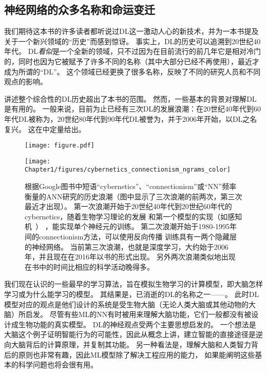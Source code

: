 \subsection{神经网络的众多名称和命运变迁}
\label{sec:the_many_names_and_changing_fortunes_of_neural_networks}

我们期待这本书的许多读者都听说过\gls{DL}这一激动人心的新技术，并为一本书提及关于一个新兴领域的``历史''而感到惊讶。
事实上，\gls{DL}的历史可以追溯到20世纪40年代。
\gls{DL}\emph{看似}是一个全新的领域，只不过因为在目前流行的前几年它是相对冷门的，同时也因为它被赋予了许多不同的名称（其中大部分已经不再使用），最近才成为所谓的``\gls{DL}''。
这个领域已经更换了很多名称，反映了不同的研究人员和不同观点的影响。

讲述整个综合性的\gls{DL}历史超出了本书的范围。
然而，一些基本的背景对理解\gls{DL}是有用的。
一般来说，目前为止已经有三次\gls{DL}的发展浪潮：在20世纪40年代到60年代\gls{DL}被称为，20世纪80年代到90年代\gls{DL}被誉为，并于2006年开始，以\gls{DL}之名复兴。
这在中定量给出。
\begin{figure}[!htb]
\ifOpenSource
\centerline{\texttt{[image: figure.pdf]}}
\else
\centerline{\texttt{[image: Chapter1/figures/cybernetics\_connectionism\_ngrams\_color]}}
\fi
\caption{根据Google图书中短语``\gls{cybernetics}''、``\gls{connectionism}''或``\gls{NN}''频率衡量的\gls{ANN}研究的历史浪潮（图中显示了三次浪潮的前两次，第三次最近才出现）。
第一次浪潮开始于20世纪40年代到20世纪60年代的\gls{cybernetics}，随着生物学习理论的发展\citep{McCulloch43,Hebb49}
和第一个模型的实现（如感知机~\citep{Rosenblatt-1958}） ，能实现单个神经元的训练。
第二次浪潮开始于1980-1995年间的\gls{connectionism}方法，可以使用反向传播\citep{Rumelhart86b-small} 训练具有一两个隐藏层的神经网络。
当前第三次浪潮，也就是深度学习，大约始于2006年\citep{Hinton06,Bengio-nips-2006-small,ranzato-07-small}，并且现在在2016年以书的形式出现。
另外两次浪潮类似地出现在书中的时间比相应的科学活动晚得多。
}
\label{fig:chap1_cybernetics_connectionism_ngrams_color}
\end{figure}


我们现在认识的一些最早的学习算法，旨在模拟生物学习的计算模型，即大脑怎样学习或为什么能学习的模型。
其结果是，已消逝的\gls{DL}的名称之一——。
此时\gls{DL}模型对应的观点是他们设计的系统是受生物大脑（无论人类大脑或其他动物的大脑）所启发。
尽管有些\gls{ML}的\gls{NN}有时被用来理解大脑功能\citep{hinton1991lesioning}，它们一般都没有被设计成生物功能的真实模型。
\gls{DL}的神经观点受两个主要思想启发的。
一个想法是大脑这个例子证明智能行为的可能性，因此从概念上讲，建立智能的直接途径是逆向大脑背后的计算原理，并复制其功能。
另一种看法是，理解大脑和人类智力背后的原则也非常有趣，因此\gls{ML}模型除了解决工程应用的能力， 如果能阐明这些基本的科学问题也将会很有用。 


